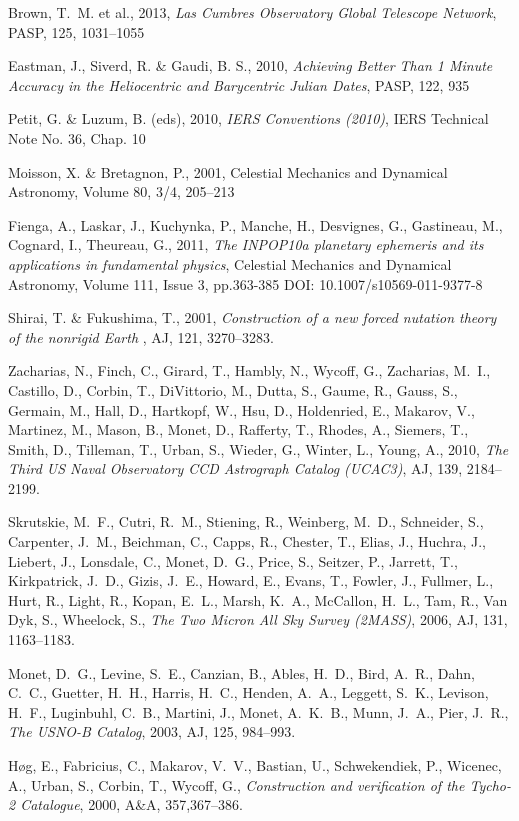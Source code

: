 \documentclass[twoside,11pt]{article}
\renewcommand{\_}{\texttt{\symbol{95}}}
\begin{document}
\begin{thebibliography}{}
 Brown, T.~M. et al., 2013, \textit{Las Cumbres
Observatory Global Telescope Network}, PASP, 125, 1031--1055

 Eastman, J., Siverd, R. \& Gaudi, B. S., 2010, \textit{Achieving Better Than 1 Minute Accuracy in the Heliocentric and Barycentric
Julian Dates}, PASP, 122, 935

 Petit, G. \& Luzum, B. (eds), 2010, \textit{IERS Conventions
(2010)}, IERS Technical Note No. 36, Chap. 10

 Moisson, X. \& Bretagnon, P., 2001, Celestial Mechanics and
Dynamical Astronomy, Volume 80, 3/4, 205--213

 Fienga, A., Laskar, J., Kuchynka, P., Manche, H., Desvignes,
G., Gastineau, M., Cognard, I., Theureau, G., 2011, \textit{The INPOP10a
planetary ephemeris and its applications in fundamental physics}, 
Celestial Mechanics and Dynamical Astronomy, Volume 111, Issue 3, pp.363-385
DOI: 10.1007/s10569-011-9377-8

 Shirai, T. \& Fukushima, T., 2001, \textit{Construction of a
new forced nutation theory of the nonrigid Earth }, AJ, 121, 3270--3283. 

 Zacharias, N., Finch, C., Girard, T., Hambly, N.,  Wycoff, G.,
Zacharias, M.~I., Castillo, D., Corbin, T.,  DiVittorio, M., Dutta, S., Gaume,
R., Gauss, S.,  Germain, M., Hall, D., Hartkopf, W., Hsu, D.,  Holdenried, E.,
Makarov, V., Martinez, M., Mason, B.,  Monet, D., Rafferty, T., Rhodes, A.,
Siemers, T.,  Smith, D., Tilleman, T., Urban, S., Wieder, G.,  Winter, L.,
Young, A., 2010, \textit{The Third US Naval Observatory CCD Astrograph Catalog
(UCAC3)}, AJ, 139, 2184--2199.

 Skrutskie, M.~F., Cutri, R.~M., Stiening, R.,  Weinberg, M.~D.,
Schneider, S., Carpenter, J.~M.,  Beichman, C., Capps, R., Chester, T., Elias,
J.,  Huchra, J., Liebert, J., Lonsdale, C., Monet, D.~G.,  Price, S., Seitzer,
P., Jarrett, T., Kirkpatrick, J.~D.,  Gizis, J.~E., Howard, E., Evans, T.,
Fowler, J.,  Fullmer, L., Hurt, R., Light, R., Kopan, E.~L.,  Marsh, K.~A.,
McCallon, H.~L., Tam, R., Van Dyk, S.,  Wheelock, S., \textit{The Two Micron All
Sky Survey (2MASS)}, 2006, AJ, 131, 1163--1183.

 Monet, D.~G., Levine, S.~E., Canzian, B., Ables, H.~D., 
Bird, A.~R., Dahn, C.~C., Guetter, H.~H., Harris, H.~C.,  Henden, A.~A.,
Leggett, S.~K., Levison, H.~F.,  Luginbuhl, C.~B., Martini, J., Monet,
A.~K.~B.,  Munn, J.~A., Pier, J.~R., \textit{The USNO-B Catalog}, 2003, AJ,
125, 984--993.

 H{\o}g, E., Fabricius, C., Makarov, V.~V., Bastian, U., 
Schwekendiek, P., Wicenec, A., Urban, S., Corbin, T.,  Wycoff, G.,
\textit{Construction and verification of the Tycho-2 Catalogue}, 2000, A\&A,
357,367--386.

\end{thebibliography}
\end{document}
